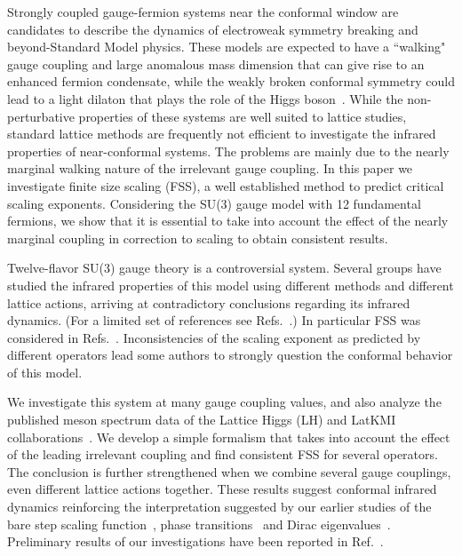 \documentclass[aps,prl,twocolumn,]{revtex4-1}  %
\newcommand{\refcite}[1]{Ref.~\cite{#1}}
\begin{document}
Strongly coupled gauge-fermion systems near the conformal window are   candidates to describe the dynamics of electroweak symmetry breaking and beyond-Standard Model physics. 
These models are  expected to have a ``walking"  gauge coupling  and large anomalous mass dimension that can give rise to an enhanced fermion condensate,  while the weakly broken conformal symmetry could lead to a light dilaton that  plays the role of the Higgs boson~\cite{Appelquist:2013sia}.
While the  non-perturbative properties of these systems are well suited to lattice studies,   standard lattice methods are frequently not efficient to investigate the infrared properties of near-conformal systems. 
The problems are mainly due to  the nearly marginal walking nature of the irrelevant gauge coupling. In this paper we investigate finite size scaling (FSS), a well established method to predict critical scaling exponents.
Considering the SU(3) gauge model with 12 fundamental fermions, we show that it is essential to take into account the effect of the nearly marginal  coupling in correction to scaling to obtain consistent results. 

Twelve-flavor SU(3) gauge theory is a controversial system.
Several groups have studied the infrared properties of this model using different methods and different lattice actions, arriving at contradictory conclusions regarding its infrared dynamics.
(For a limited set of references see Refs.~\cite{Appelquist:2009ty, Deuzeman:2009mh,  Fodor:2011tu, Appelquist:2011dp,DeGrand:2011cu, Hasenfratz:2011xn,Cheng:2011ic, Cheng:2013eu, Fodor:2012uw, Fodor:2012et,  Aoki:2012eq, Aoki:2013pca, Itou:2012qn, Lin:2012iw, Jin:2012dw}.) In particular FSS was considered in Refs.~\cite{Fodor:2011tu,Appelquist:2011dp,DeGrand:2011cu,Fodor:2012et,Aoki:2012eq}. Inconsistencies of the scaling exponent as predicted by different operators lead some authors to strongly question the conformal  behavior of this model.

We investigate this system at many gauge coupling values, and  also analyze the published meson spectrum data of the Lattice Higgs (LH) and LatKMI collaborations~\cite{Fodor:2011tu,Aoki:2012eq}. We develop a simple  formalism that  takes into account the effect of the leading irrelevant coupling and find consistent FSS  for several operators. The conclusion is further strengthened  when we combine several gauge couplings,  even  different lattice actions  together. These results suggest conformal infrared dynamics reinforcing the interpretation suggested by our earlier studies of the bare step scaling function~\cite{Hasenfratz:2011xn}, phase transitions~\cite{Hasenfratz:2013uha} and Dirac eigenvalues~\cite{Cheng:2013eu}.
 Preliminary results of our investigations have been reported in \refcite{Hasenfratz:2013eka}.
\end{document}
